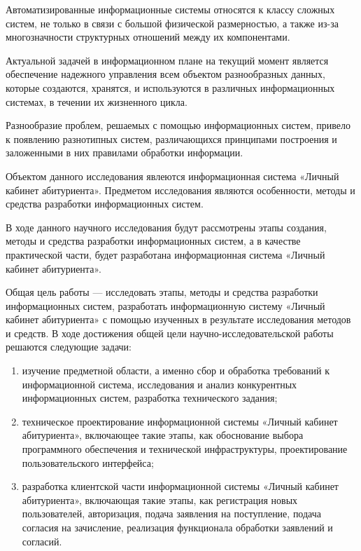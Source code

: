 \intro
Автоматизированные информационные системы относятся к классу сложных систем, не только в связи с большой физической размерностью, а также из-за многозначности структурных отношений между их компонентами.

Актуальной задачей в информационном плане на текущий момент является обеспечение надежного управления всем объектом разнообразных данных, которые создаются, хранятся, и используются в различных информационных системах, в течении их жизненного цикла.

Разнообразие проблем, решаемых с помощью информационных систем, привело к появлению разнотипных систем, различающихся принципами построения и заложенными в них правилами обработки информации.

Объектом данного исследования явлеются информационная система «Личный кабинет абитуриента». Предметом исследования являются особенности, методы и средства разработки информационных систем.

В ходе данного научного исследования будут рассмотрены этапы создания, методы и средства разработки информационных систем, а в качестве практической части, будет разработана информационная система «Личный кабинет абитуриента».

Общая цель работы — исследовать этапы, методы и средства разработки информационных систем, разработать информационную систему «Личный кабинет абитуриента» с помощью изученных в результате исследования методов и средств. В ходе достижения общей цели научно-исследовательской работы решаются следующие задачи:


\begin{enumerate} 
  \item изучение предметной области, а именно сбор и обработка требований к информационной система, исследования и анализ конкурентных информационных систем, разработка технического задания;
  
  \item  техническое проектирование информационной системы «Личный кабинет абитуриента», включающее такие этапы, как обоснование выбора программного обеспечения и технической инфраструктуры, проектирование пользовательского интерфейса;
  
  \item  разработка клиентской части информационной системы «Личный кабинет абитуриента», включающая такие этапы, как регистрация новых пользователей, авторизация, подача заявления на поступление, подача согласия на зачисление, реализация функционала обработки заявлений и согласий.
\end{enumerate}